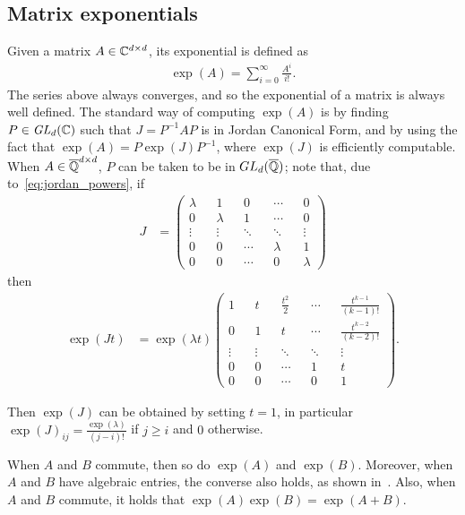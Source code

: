 \subsection{Matrix exponentials}
\label{sec:matrix_exp}

Given a matrix $A \in \mathbb{C}^{d \times d}$, its exponential is defined as
\begin{align*}
\exp(A) = \sum \limits_{i=0}^{\infty} \frac{A^{i}}{i!} .
\end{align*}
The series above always converges, and so the exponential of a matrix is always well defined.
The standard way of computing $\exp(A)$ is by finding $P \in \mathit{GL}_{d}(\mathbb{C})$ such that $J=P^{-1}AP$ is in Jordan Canonical Form, and by using the fact that $\exp(A) = P \exp(J) P^{-1}$, where $\exp(J)$ is efficiently computable.
When $A \in \overline{\mathbb{Q}}^{d \times d}$, $P$ can be taken to be in $GL_{d}(\overline{\mathbb{Q}})$; note that, due to~\cref{eq:jordan_powers}, if
\begin{align*}
J &= \begin{pmatrix}
\lambda && 1 && 0 && \cdots && 0 \\
0 && \lambda && 1 &&\cdots && 0 \\
\vdots && \vdots && \ddots && \ddots && \vdots \\
0 && 0 && \cdots && \lambda && 1 \\
0 && 0 && \cdots && 0 && \lambda
\end{pmatrix}
\end{align*}
then
\begin{align*}
\exp(Jt) &= \exp(\lambda t) \begin{pmatrix}
1 && t && \frac{t^{2}}{2} && \cdots && \frac{t^{k-1}}{(k-1)!} \\
0 && 1 && t && \cdots && \frac{t^{k-2}}{(k-2)!} \\
\vdots && \vdots &&\ddots && \ddots && \vdots \\
0 && 0 && \cdots && 1 && t \\
0 && 0 && \cdots && 0 && 1
\end{pmatrix} .
\end{align*}

Then $\exp{(J)}$ can be obtained by setting $t=1$, in particular $\exp{(J)}_{ij} = \frac{\exp(\lambda)}{(j-i)!}$ if $j \geq i$ and $0$ otherwise.

When $A$ and $B$ commute, then so do $\exp(A)$ and $\exp(B)$. Moreover, when $A$ and $B$ have algebraic entries, the converse also holds, as shown in~\cite{MatrixExps}. Also, when $A$ and $B$ commute, it holds that $\exp{(A)}\exp{(B)} = \exp{(A+B)}$.

